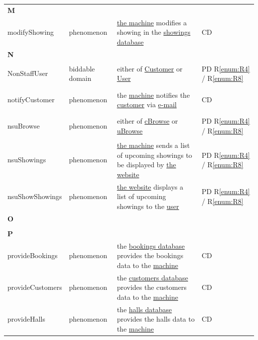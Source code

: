 \documentclass[a4paper,10pt,titlepage,bibtotoc,bibtotocnumbered]{scrreprt}
\begin{document}
\begin{longtable}{|l|p{3cm}|p{5cm}|l|}
&  &  & \\
\hline
\multicolumn{4}{|l|}{\textbf{M}}\\
\hline
\hypertarget{glossary:modifyShowing}{modifyShowing} & phenomenon & \hyperlink{glossary:UDEKino}{the machine} modifies a showing in the \hyperlink{glossary:ShowingsDatabase}{showings database} & CD\\
\hline
\multicolumn{4}{|l|}{\textbf{N}}\\
\hline
\hypertarget{glossary:NonStaffUser}{NonStaffUser} & biddable domain & either of \hyperlink{glossary:Customer}{Customer} or \hyperlink{glossary:User}{User} & PD R\ref{enum:R4} / R\ref{enum:R8}\\
\hline
\hypertarget{glossary:notifyCustomer}{notifyCustomer} & phenomenon & the \hyperlink{glossary:UDEKino}{machine} notifies the \hyperlink{glossary:Customer}{customer} via \hyperlink{glossary:Email}{e-mail} & CD\\
\hline
\hypertarget{glossary:nsuBrowse}{nsuBrowse} & phenomenon & either of \hyperlink{glossary:cBrowse}{cBrowse} or \hyperlink{glossary:uBrowse}{uBrowse} & PD R\ref{enum:R4} / R\ref{enum:R8}\\
\hline
\hypertarget{glossary:nsuShowings}{nsuShowings} & phenomenon & \hyperlink{glossary:UDEK-NonStaffUserBrowse}{the machine} sends a list of upcoming showings to be displayed by \hyperlink{glossary:WebPageNonStaffUserBrowse}{the website} & PD R\ref{enum:R4} / R\ref{enum:R8}\\
\hline
\hypertarget{glossary:nsuShowShowings}{nsuShowShowings} & phenomenon & \hyperlink{glossary:WebPageNonStaffUserBrowse}{the website} displays a list of upcoming showings to the \hyperlink{glossary:NonStaffUser}{user} & PD R\ref{enum:R4} / R\ref{enum:R8}\\
\hline
\multicolumn{4}{|l|}{\textbf{O}}\\
\hline
&  &  & \\
\hline
\multicolumn{4}{|l|}{\textbf{P}}\\
\hline
\hypertarget{glossary:provideBookings}{provideBookings} & phenomenon & the \hyperlink{glossary:BookingsDatabase}{bookings database} provides the bookings data to the \hyperlink{glossary:UDEKino}{machine} & CD\\
\hline
\hypertarget{glossary:provideCustomers}{provideCustomers} & phenomenon & the \hyperlink{glossary:CustomersDatabase}{customers database} provides the customers data to the \hyperlink{glossary:UDEKino}{machine} & CD\\
\hline
\hypertarget{glossary:provideHalls}{provideHalls} & phenomenon & the \hyperlink{glossary:HallsDatabase}{halls database} provides the halls data to the \hyperlink{glossary:UDEKino}{machine} & CD\\

\end{longtable}
\end{document}
